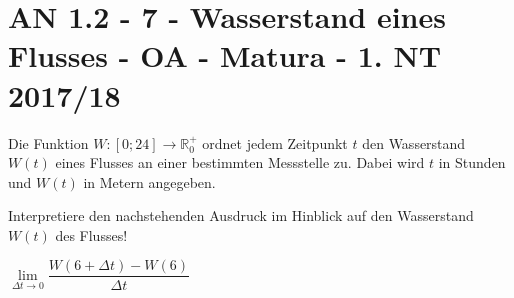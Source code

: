\section{AN 1.2 - 7 - Wasserstand eines Flusses - OA - Matura - 1. NT 2017/18}

\begin{beispiel}[AN 1.2]{1}
Die Funktion $W\!:[0;24]\rightarrow\mathbb{R}^+_0$ ordnet jedem Zeitpunkt $t$ den Wasserstand $W(t)$ eines Flusses an einer bestimmten Messstelle zu. Dabei wird $t$ in Stunden und $W(t)$ in Metern angegeben.

Interpretiere den nachstehenden Ausdruck im Hinblick auf den Wasserstand $W(t)$ des Flusses!\leer

$\lim\limits_{\Delta t\rightarrow 0}\dfrac{W(6+\Delta t)-W(6)}{\Delta t}$

\end{beispiel}